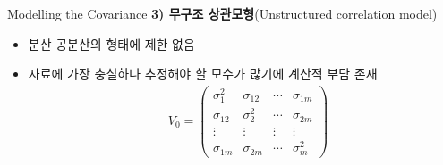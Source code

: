 \documentclass[9pt, xelatex]{beamer}
\begin{document}
{\begin{frame}[allowframebreaks]{Modelling the Covariance}
	\textbf{3) 무구조 상관모형}(Unstructured correlation model) \\
	\vspace{2mm}	
	\begin{itemize}
		\item 분산 공분산의 형태에 제한 없음
		\item 자료에 가장 충실하나 추정해야 할 모수가 많기에 계산적 부담 존재 
		\begin{align*}
			& V_0 = \begin{pmatrix}
				\sigma_1^2 & \sigma_{12} & \cdots & \sigma_{1m} \\
				\sigma_{12} & \sigma_{2}^2 & \cdots & \sigma_{2m} \\
				\vdots & \vdots & \vdots & \vdots \\
				\sigma_{1m} & \sigma_{2m} & \cdots & \sigma_{m}^2 								
			\end{pmatrix}
		\end{align*} 
	\end{itemize}	
	

\end{frame}}
\end{document}

